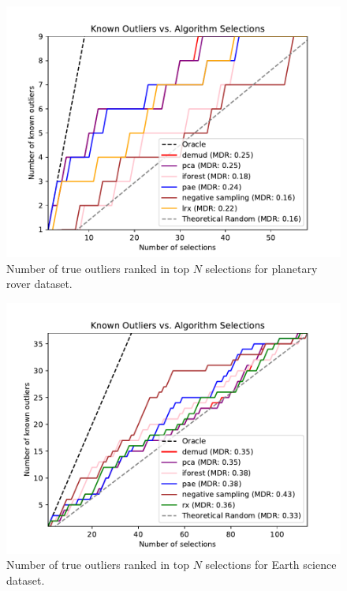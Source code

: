 \documentclass[letterpaper]{article} %
\begin{document}
\begin{figure}
    \centering
    \includegraphics[width=\linewidth]{figures/planetary_combined_plot.pdf}
    \caption{Number of true outliers ranked in top $N$ selections for 
    planetary rover dataset.}
    \label{fig:planetary_results}
\end{figure}

\begin{figure}
    \centering
    \includegraphics[width=\linewidth]{figures/faw_combined_plot.pdf}
    \caption{Number of true outliers ranked in top $N$ selections for 
    Earth science dataset.}
    \label{fig:faw_results}
\end{figure}
\end{document}
